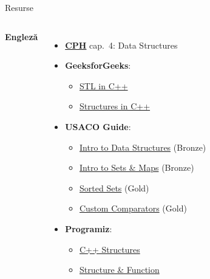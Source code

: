 ﻿\documentclass{beamer}
\begin{document}
\begin{frame}{Resurse}
\begin{columns}[T]
    \textbf{Engleză}
    \begin{itemize}\footnotesize\itemsep1pt
      \item \href{https://cses.fi/book/book.pdf}{\textbf{CPH}}
            \textemdash{} cap.\ 4: Data Structures
      \item \textbf{GeeksforGeeks}:
      \begin{itemize}\tiny\itemsep0pt
        \item \href{https://www.geeksforgeeks.org/cpp/the-c-standard-template-library-stl/}{STL in C++}
        \item \href{https://www.geeksforgeeks.org/cpp/structures-in-cpp/}{Structures in C++}
      \end{itemize}
      \item \textbf{USACO Guide}:
      \begin{itemize}\tiny\itemsep0pt
        \item \href{https://usaco.guide/bronze/intro-ds}{Intro to Data Structures} (Bronze)
        \item \href{https://usaco.guide/bronze/intro-sets}{Intro to Sets \& Maps} (Bronze)
        \item \href{https://usaco.guide/gold/intro-sorted-sets}{Sorted Sets} (Gold)
        \item \href{https://usaco.guide/gold/custom-cpp-stl}{Custom Comparators} (Gold)
      \end{itemize}
      \item \textbf{Programiz}:
      \begin{itemize}\tiny\itemsep0pt
        \item \href{https://www.programiz.com/cpp-programming/structure}{C++ Structures}
        \item \href{https://www.programiz.com/cpp-programming/structure-function}{Structure \& Function}
      \end{itemize}
    \end{itemize}
  \end{columns}
\end{frame}
\end{document}
